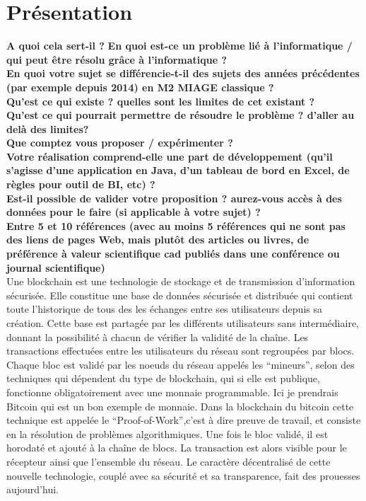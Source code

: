 \chapter*{Présentation}
\label{chap:presentation}

\textbf{A quoi cela sert-il ? }
\textbf{En quoi est-ce un problème lié à l’informatique / qui peut être résolu grâce à l’informatique ?}\\

\textbf{ En quoi votre sujet se différencie-t-il des sujets des années précédentes (par exemple depuis 2014) en M2 MIAGE classique ? }\\

\textbf{Qu’est ce qui existe ? quelles sont les limites de cet existant ?}\\

\textbf{Qu’est ce qui pourrait permettre de résoudre le problème ? d’aller au delà des limites?}\\

\textbf{Que comptez vous proposer / expérimenter ? }\\

\textbf{Votre réalisation comprend-elle une part de développement (qu’il s’agisse d’une application en Java, d’un tableau de bord en Excel, de règles pour outil de BI, etc) ?}\\

\textbf{ Est-il possible de valider votre proposition ? aurez-vous accès à des données pour le faire (si applicable à votre sujet) ? }\\

\textbf{Entre 5 et 10 références (avec au moins 5 références qui ne sont pas des liens de pages Web, mais plutôt des articles ou livres, de préférence à valeur scientifique cad publiés dans une conférence ou journal scientifique) }\\

Une blockchain est une technologie de stockage et de transmission d’information sécurisée. Elle constitue une base de données sécurisée et distribuée qui contient toute l’historique de tous des les échanges entre ses utilisateurs depuis sa création. Cette base est partagée par les différents utilisateurs sans intermédiaire, donnant la possibilité à chacun de vérifier la validité de la chaîne. Les transactions effectuées entre les utilisateurs du réseau sont regroupées par blocs. Chaque bloc est validé par les noeuds du réseau appelés les “mineurs”, selon des techniques qui dépendent du type de blockchain, qui si elle est publique, fonctionne obligatoirement avec une monnaie programmable. Ici je prendrais Bitcoin qui est un bon exemple de monnaie. Dans la blockchain du bitcoin cette technique est appelée le “Proof-of-Work”,c’est à dire preuve de travail, et consiste en la résolution de problèmes algorithmiques. Une fois le bloc validé, il est horodaté et ajouté à la chaîne de blocs. La transaction est alors visible pour le récepteur ainsi que l’ensemble du réseau. Le caractère décentralisé de cette nouvelle technologie, couplé avec sa sécurité et sa transparence, fait des prouesses aujourd’hui.\\

